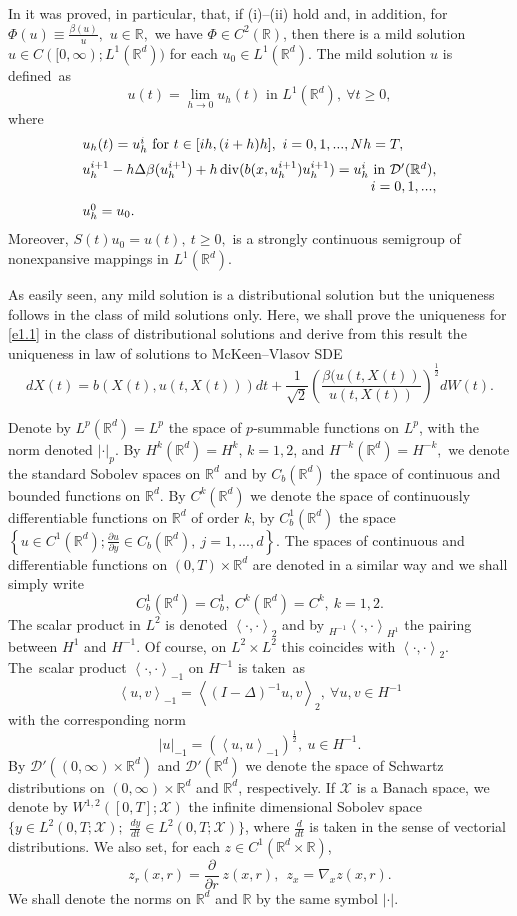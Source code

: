 \documentclass[12pt]{article}
\def\rrd{{\rr^d}}
\def\cald{{\mathcal{D}}}
\def\calx{{\mathcal{X}}}
\def\({\left(}
\def\){\right)}
\def\vsp{\vspace*{1,5mm}\\ }
\def\n{\noindent }
\def\D{{\Delta}}
\def\barr{\begin{array}}
\def\earr{\end{array}}
\def\D{{\Delta}}
\theoremstyle{definition}
\def\1{^{-1}}
\def\vsp{\vspace*{2mm}\\ }
\def\calx{{\mathcal{X}}}
\def\rr{{\mathbb{R}}}
\def\9{{\infty}}
\def\b{{\beta}}
\def\pp{{\partial}}
\def\D{{\Delta}}
\def\barr{\begin{array}}
\def\earr{\end{array}}
\def\n{\noindent }
\def\vsp{\vspace*{2mm}\\ }
\def\ff{\forall }
\def\({\left(}
\def\){\right)}
\def\<{\left<}
\def\>{\right>}
\begin{document}
In \cite{1} it was proved, in particular, that, if (i)--(ii) hold and, in addition, for $\Phi(u)\equiv\frac{\beta(u)}u,$ $u\in\rr,$ we have $\Phi\in C^2(\rr)$, then there is a  mild solution $u\in C([0,\9);L^1(\rr^d))$ for each $u_0\in L^1(\rr^d)$. The mild solution $u$ is defined~as 
$$u(t)=\lim_{h\to0}u_h(t)\mbox{ in }L^1(\rr^d),\ \ff t\ge0,$$where
\begin{equation}
\label{e1.6}
\barr{l}
u_h(t)=u^i_h\mbox{ for }t\in[ih,(i+h)h],\ i=0,1,...,Nh=T,\vsp 
u^{i+1}_h-h\D\b(u^{i+1}_h)+h\,{\rm div}(b(x,u^{i+1}_h)u^{i+1}_h)=u^i_h\mbox{ in }\cald'(\rr^d),\\\hfill i=0,1,...,\vsp 
u^0_h=u_0.\earr	
\end{equation}Moreover, $S(t)u_0=u(t),\ t\ge0,$ is a strongly continuous semigroup of nonexpansive mappings in $L^1(\rrd)$. 

As easily seen, any mild solution is a distributional solution but the uniqueness  follows in the class of mild solutions only. Here, we shall prove the uniqueness for \eqref{e1.1} in the class of distributional solutions and derive from  this result the uniqueness in law of solutions to McKeen--Vlasov SDE
\begin{equation}
\label{e1.7}
dX(t)=b(X(t),u(t,X(t)))dt+\frac1{\sqrt{2}}\(\frac{\b(u(t,X(t))}{u(t,X(t))}\)^{\frac12}dW(t).
\end{equation}

\n{\bf Notation.}  Denote by $L^p(\rr^d)=L^p$ the  space of $p$-summable functions on $L^p$, with the norm denoted $|\cdot|_p$. By $H^k(\rrd)=H^k$, $k=1,2$, and $H^{-k}(\rrd)=H^{-k},$ we denote the standard Sobolev spaces on $\rrd$ and by $C_b(\rrd)$ the space of continuous and bounded functions on $\rrd$. By $C^k(\rrd)$ we denote the space of continuously differentiable functions on $\rrd$ of order $k$, by $C^1_b(\rrd)$ the space $\left\{u\in C^1(\rrd);\frac{\pp u}{\pp y}\in C_b(\rrd),\ j=1,...,d\right\}.$ The spaces of continuous and differentiable functions on $(0,T)\times\rrd$ are denoted in a similar way and we shall simply write
$$C^1_b(\rrd)=C^1_b,\ C^k(\rrd)=C^k,\ k=1,2.$$ The scalar product in $L^2$ is denoted $\<\cdot,\cdot\>_2$ and by ${}_{H^{-1}}\!\<\cdot,\cdot\>_{H^1}$ the pairing between $H^1$ and $H^{-1}.$ Of course, on $L^2\times L^2$ this coincides with $\<\cdot,\cdot\>_2.$ The~scalar product $\<\cdot,\cdot\>_{-1}$ on $H\1$ is  taken~as
\begin{equation}
\label{e1.8}
\<u,v\>_{-1}=\<(I-\D)\1u,v\>_2,\ \ff u,v\in H\1
\end{equation}with the corresponding norm
\begin{equation}
\label{e1.9}
|u|_{-1}=(\<u,u\>_{-1})^{\frac12},\ u\in H\1.
\end{equation}
By $\cald'((0,\9)\times\rrd)$ and $\cald'(\rrd)$ we denote the space of Schwartz distributions on $(0,\9)\times\rrd$ and $\rrd$, respectively. If $\calx$ is a Banach space, we denote by $W^{1,2}([0,T];\calx)$ the infinite dimensional Sobolev space 
$\{y\in L^2(0,T;\calx);$ $\frac{dy}{dt}\in L^2(0,T;\calx)\}$, where $\frac d{dt}$ is taken in the sense of vectorial distributions. We also set, for each $z\in C^1(\rrd\times\rr)$,
$$z_r(x,r)=\frac\pp{\pp r}\ z(x,r),\ \ z_x=\nabla_x z(x,r).$$
We shall denote the norms on $\rrd$ and $\rr$  by the same symbol $|\cdot|$.
\end{document}
